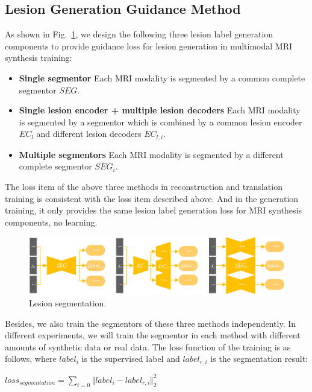 \documentclass[letterpaper]{article} %
\begin{document}
\subsection{Lesion Generation Guidance Method}
\label{label gen methods}
As shown in Fig.~\ref{segmentation}, we design the following three lesion label generation components to provide guidance loss for lesion generation in multimodal MRI synthesis training:
\begin{itemize}
	\item \textbf{Single segmentor} 
	Each MRI modality  is segmented by a common complete segmentor $SEG$.
	\item \textbf{Single lesion encoder + multiple lesion decoders} 
	Each MRI modality  is segmented by a segmentor which is combined by a common lesion encoder $EC_{l}$ and different lesion decoders $EC_{l,i}$. 
	\item \textbf{Multiple segmentors} 
	Each MRI modality  is segmented by a different complete segmentor $SEG_i$.
\end{itemize}
The loss item of the above three methods in reconstruction and translation training is consistent with the loss item described above. And in the generation training, it only provides the same lesion label generation loss for MRI synthesis components, no learning.

\begin{figure}
	\centering
	\includegraphics[width=0.8\columnwidth]{figures/segmentation}
	\caption{Lesion segmentation.}
	\label{segmentation}
\end{figure}
Besides, we also train the segmentors of these three methods independently. In different experiments, we will train the segmentor in each method with different amounts of synthetic data or real data. The loss function of the training is as follows, where $label_i$ is the supervised label and $label_{r,i}$ is the segmentation result:
\begin{center}
	$loss_{segmentation}=\sum\limits_{i=0}\Vert{label_i-label_{r,i}}\Vert_{2}^{2}$
\end{center}
\end{document}
